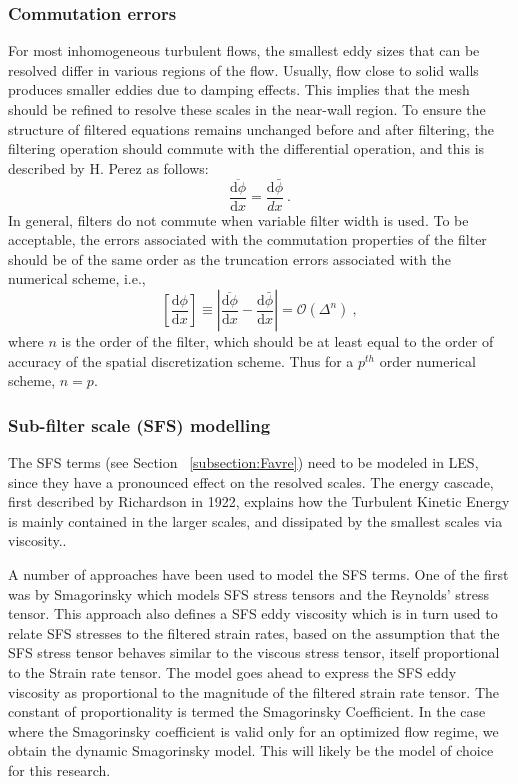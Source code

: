 \subsubsection{Commutation errors} \label{section:commutation_errors}
For most inhomogeneous turbulent flows, the smallest eddy sizes that can be resolved differ in various regions of the flow. Usually, flow close to solid walls  produces smaller eddies due to damping effects. This implies that the mesh should be refined to resolve these scales in the near-wall region. To ensure the structure of filtered equations remains unchanged before and after filtering, the filtering operation should commute with the differential operation, and this is described by H. Perez \cite{HPerez:2011} as follows: 
\begin{equation} 
\overline{\frac{\mathrm{d} \phi}{\mathrm{d} x} } = \frac{\mathrm{d} \bar{\phi}}{dx} \: .
\end{equation}
In general, filters do not commute when variable filter width is used. To be acceptable, the errors associated with the commutation properties of the filter should be of the same order as the truncation errors associated with the numerical scheme, i.e.,
 \begin{equation} \label{eq:commutation_error}
\left[ \frac{\mathrm{d} \phi}{\mathrm{d} x}   \right]  \equiv \left| \overline{\frac{\mathrm{d} \phi}{\mathrm{d} x} } - \frac{\mathrm{d} \bar{\phi}}{\mathrm{d}x}\right| = \mathcal{O}(\Delta^n) \: ,
\end{equation}
 where $n$ is the order of the filter, which should be at least equal to the order of accuracy of the spatial discretization scheme. Thus for a $p^{th}$ order numerical scheme, $n = p$.


\subsubsection{Sub-filter scale (SFS) modelling}
The SFS terms (see Section ~\ref{subsection:Favre}) need to be modeled in LES, since they have a pronounced effect on the resolved scales. The energy cascade, first described by Richardson in 1922, explains how the Turbulent Kinetic Energy is mainly contained in the larger scales, and dissipated by the smallest scales via viscosity.\cite{Pope:2005}.\par
A number of approaches have been used to model the SFS terms. One of the first was by Smagorinsky \cite{Smagorinsky:1963} which models SFS stress tensors and the Reynolds' stress tensor. This approach also defines a SFS eddy viscosity which is in turn used to relate SFS stresses to the filtered strain rates, based on the assumption that the SFS stress tensor behaves similar to the viscous stress tensor, itself proportional to the Strain rate tensor. The model goes ahead to express the SFS eddy viscosity as proportional to the magnitude of the filtered strain rate tensor. The constant of proportionality is termed the Smagorinsky Coefficient. In the case where the Smagorinsky coefficient is valid only for an optimized flow regime, we obtain the dynamic Smagorinsky model. This will likely be the model of choice for this research.
